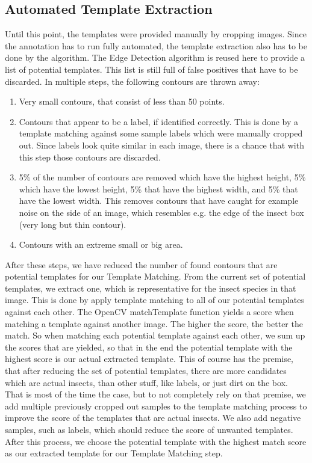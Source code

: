 \subsection{Automated Template Extraction}
Until this point, the templates were provided manually by cropping images. 
Since the annotation has to run fully automated, the template extraction also has to be done by the algorithm.
The Edge Detection algorithm is reused here to provide a list of potential templates.
This list is still full of false positives that have to be discarded.
In multiple steps, the following contours are thrown away: 
\begin{enumerate}
	\item Very small contours, that consist of less than 50 points.
	\item Contours that appear to be a label, if identified correctly.
	This is done by a template matching against some sample labels which were manually cropped out.
	Since labels look quite similar in each image, there is a chance that with this step those contours are discarded.
	\item 5\% of the number of contours are removed which have the highest height, 5\% which have the lowest height, 5\% that have the highest width, and 5\% that have the lowest width.
	This removes contours that have caught for example noise on the side of an image, which resembles e.g. the edge of the insect box (very long but thin contour).
	\item Contours with an extreme small or big area.
\end{enumerate}
After these steps, we have reduced the number of found contours that are potential templates for our Template Matching.
From the current set of potential templates, we extract one, which is representative for the insect species in that image.
This is done by apply template matching to all of our potential templates against each other.
The OpenCV matchTemplate function yields a score when matching a template against another image.
The higher the score, the better the match.
So when matching each potential template against each other, we sum up the scores that are yielded, so that in the end the potential template with the highest score is our actual extracted template.
This of course has the premise, that after reducing the set of potential templates, there are more candidates which are actual insects, than other stuff, like labels, or just dirt on the box.
That is most of the time the case, but to not completely rely on that premise, we add multiple previously cropped out samples to the template matching process to improve the score of the templates that are actual insects.
We also add negative samples, such as labels, which should reduce the score of unwanted templates.
After this process, we choose the potential template with the highest match score as our extracted template for our Template Matching step.

